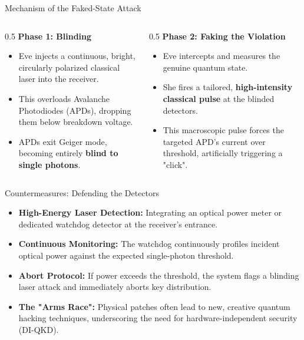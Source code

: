 \documentclass[aspectratio=169]{beamer}
\begin{document}
\begin{frame}{Mechanism of the Faked-State Attack}
    \begin{columns}
        \begin{column}{0.5\textwidth}
            \textbf{Phase 1: Blinding}
            \begin{itemize}
                \item Eve injects a continuous, bright, circularly polarized classical laser into the receiver.
                \item This overloads Avalanche Photodiodes (APDs), dropping them below breakdown voltage.
                \item APDs exit Geiger mode, becoming entirely \textbf{blind to single photons}.
            \end{itemize}
        \end{column}
        \begin{column}{0.5\textwidth}
            \textbf{Phase 2: Faking the Violation}
            \begin{itemize}
                \item Eve intercepts and measures the genuine quantum state.
                \item She fires a tailored, \textbf{high-intensity classical pulse} at the blinded detectors.
                \item This macroscopic pulse forces the targeted APD's current over threshold, artificially triggering a "click".
            \end{itemize}
        \end{column}
    \end{columns}
\end{frame}

\begin{frame}{Countermeasures: Defending the Detectors}
    \begin{itemize}
        \item \textbf{High-Energy Laser Detection:} Integrating an optical power meter or dedicated watchdog detector at the receiver's entrance.
        \item \textbf{Continuous Monitoring:} The watchdog continuously profiles incident optical power against the expected single-photon threshold.
        \item \textbf{Abort Protocol:} If power exceeds the threshold, the system flags a blinding laser attack and immediately aborts key distribution.
        \item \textbf{The "Arms Race":} Physical patches often lead to new, creative quantum hacking techniques, underscoring the need for hardware-independent security (DI-QKD).
    \end{itemize}
\end{frame}
\end{document}
